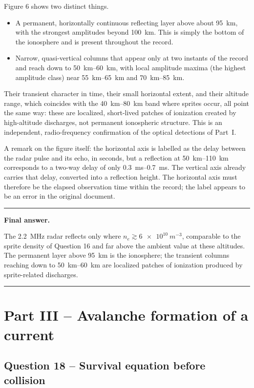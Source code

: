 \documentclass[11pt,a4paper]{article}
\newenvironment{finalanswer}{%
  \begin{center}\begin{minipage}{0.94\linewidth}\hrule\vspace{0.45em}\textbf{Final answer. }%
}{%
  \vspace{0.45em}\hrule\end{minipage}\end{center}%
}
\begin{document}
Figure 6 shows two distinct things.
\begin{itemize}[nosep]
\item A permanent, horizontally continuous reflecting layer above about
\SI{95}{km}, with the strongest amplitudes beyond \SI{100}{km}. This is simply
the bottom of the ionosphere and is present throughout the record.
\item Narrow, quasi-vertical columns that appear only at two instants of the
record and reach down to \SIrange{50}{60}{km}, with local amplitude maxima
(the highest amplitude class) near \SIrange{55}{65}{km} and
\SIrange{70}{85}{km}.
\end{itemize}
Their transient character in time, their small horizontal extent, and their
altitude range, which coincides with the \SIrange{40}{80}{km} band where sprites
occur, all point the same way: these are localized, short-lived patches of
ionization created by high-altitude discharges, not permanent ionospheric
structure. This is an independent, radio-frequency confirmation of the optical
detections of Part~I.

A remark on the figure itself: the horizontal axis is labelled as the delay
between the radar pulse and its echo, in seconds, but a reflection at
\SIrange{50}{110}{km} corresponds to a two-way delay of only
\SIrange{0.3}{0.7}{ms}. The vertical axis already carries that delay, converted
into a reflection height. The horizontal axis must therefore be the elapsed
observation time within the record; the label appears to be an error in the
original document.

\begin{finalanswer}
The \SI{2.2}{MHz} radar reflects only where $n_e\gtrsim\SI{6e10}{m^{-3}}$, comparable to the sprite density of Question 16 and far above the ambient value at these altitudes. The permanent layer above \SI{95}{km} is the ionosphere; the transient columns reaching down to \SIrange{50}{60}{km} are localized patches of ionization produced by sprite-related discharges.
\end{finalanswer}

\section{Part III -- Avalanche formation of a current}

\subsection*{Question 18 -- Survival equation before collision}
\end{document}
